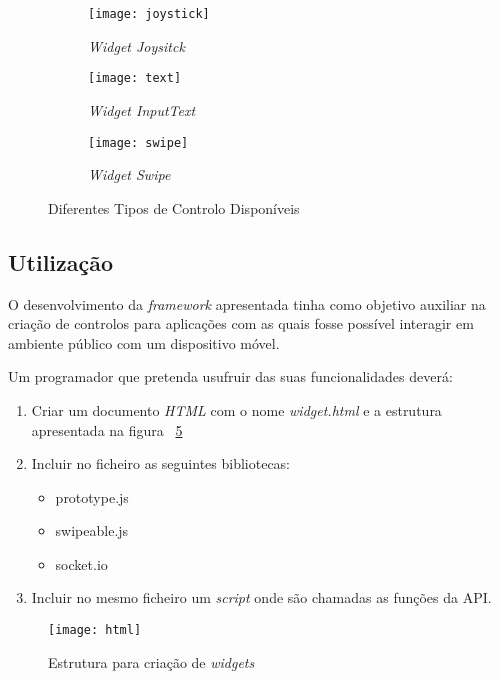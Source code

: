 	\begin{figure}[ht]
	  \centering
	  \leavevmode
	  \begin{subfigure}{.33\textwidth}
	    \centering
	    \texttt{[image: joystick]}
	    \caption{\textit{Widget Joysitck}}
	    \label{fig:joystick}
	  \end{subfigure}%
	  \begin{subfigure}{.33\textwidth}
	    \centering
	    \texttt{[image: text]}
	    \caption{\textit{Widget InputText}}
	    \label{fig:inputext}
	  \end{subfigure}%
	   \begin{subfigure}{.33\textwidth}
	    \centering
	    \texttt{[image: swipe]}
	    \caption{\textit{Widget Swipe}}
	    \label{fig:swipe}
	  \end{subfigure}
	  \caption{Diferentes Tipos de Controlo Disponíveis}
	  \label{fig:widgets}
	\end{figure}

\pagebreak

\subsection{Utilização}

	O desenvolvimento da \textit{framework} apresentada tinha como objetivo auxiliar na criação de controlos para aplicações com as quais fosse possível interagir em ambiente público com um dispositivo móvel.

	Um programador que pretenda usufruir das suas funcionalidades deverá:

	\begin{enumerate}
		\item Criar um documento \textit{HTML} com o nome \textit{widget.html} e a estrutura apresentada na figura ~\ref{fig:html_struct}
		\item Incluir no ficheiro as seguintes bibliotecas:
			\begin{itemize}
			\item prototype.js
			\item swipeable.js
			\item socket.io
			\end{itemize}
		\item Incluir no mesmo ficheiro um \textit{script}
		 onde são chamadas as funções da API.
	\end{enumerate}

	\begin{figure}[ht]
		\centering
		\texttt{[image: html]}
		\caption[Estrutura \textit{HTML}] {Estrutura para criação de \textit{widgets}}
		\label{fig:html_struct}
	\end{figure}


